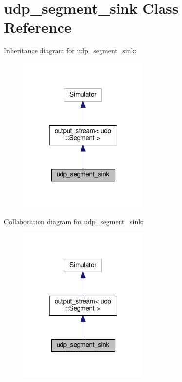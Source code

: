 \hypertarget{classudp__segment__sink}{}\section{udp\+\_\+segment\+\_\+sink Class Reference}
\label{classudp__segment__sink}


Inheritance diagram for udp\+\_\+segment\+\_\+sink\+:
\nopagebreak
\begin{figure}[H]
\begin{center}
\leavevmode
\includegraphics[width=184pt]{classudp__segment__sink__inherit__graph}
\end{center}
\end{figure}


Collaboration diagram for udp\+\_\+segment\+\_\+sink\+:
\nopagebreak
\begin{figure}[H]
\begin{center}
\leavevmode
\includegraphics[width=184pt]{classudp__segment__sink__coll__graph}
\end{center}
\end{figure}
